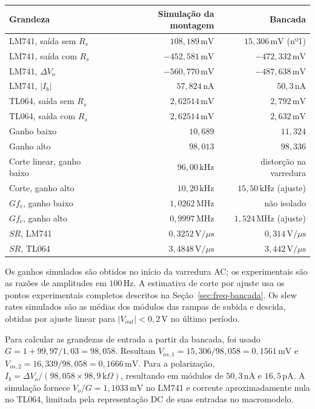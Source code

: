 \documentclass[11pt,a4paper]{article}
\begin{document}
\begin{center}\small
\setlength{\tabcolsep}{4pt}
\begin{tabular}{@{}lrr@{}}
\toprule
\textbf{Grandeza} & \textbf{Simulação da montagem} & \textbf{Bancada} \\
\midrule
LM741, saída sem \(R_s\) & \(108{,}189\,\text{mV}\) & \(15{,}306\,\text{mV}\) (nº1) \\
LM741, saída com \(R_s\) & \(-452{,}581\,\text{mV}\) & \(-472{,}332\,\text{mV}\) \\
LM741, \(\Delta V_o\) & \(-560{,}770\,\text{mV}\) & \(-487{,}638\,\text{mV}\) \\
LM741, \(\lvert I_b\rvert\) & \(57{,}824\,\text{nA}\) & \(50{,}3\,\text{nA}\) \\
TL064, saída sem \(R_s\) & \(2{,}62514\,\text{mV}\) & \(2{,}792\,\text{mV}\) \\
TL064, saída com \(R_s\) & \(2{,}62514\,\text{mV}\) & \(2{,}632\,\text{mV}\) \\
Ganho baixo & \(10{,}689\) & \(11{,}324\) \\
Ganho alto & \(98{,}013\) & \(98{,}336\) \\
Corte linear, ganho baixo & \(96{,}00\,\text{kHz}\) & distorção na varredura \\
Corte, ganho alto & \(10{,}20\,\text{kHz}\) & \(15{,}50\,\text{kHz}\) (ajuste) \\
\(Gf_c\), ganho baixo & \(1{,}0262\,\text{MHz}\) & não isolado \\
\(Gf_c\), ganho alto & \(0{,}9997\,\text{MHz}\) & \(1{,}524\,\text{MHz}\) (ajuste) \\
\(SR\), LM741 & \(0{,}3252\,\text{V}/\mu\text{s}\) & \(0{,}314\,\text{V}/\mu\text{s}\) \\
\(SR\), TL064 & \(3{,}4848\,\text{V}/\mu\text{s}\) & \(3{,}442\,\text{V}/\mu\text{s}\) \\
\bottomrule
\end{tabular}
\end{center}

Os ganhos simulados são obtidos no início da varredura AC; os experimentais são as
razões de amplitudes em \(100\,\text{Hz}\). A estimativa de corte por ajuste usa os
pontos experimentais completos descritos na Seção~\ref{sec:freq-bancada}.
Os slew rates simulados são as médias dos módulos das rampas de subida e descida,
obtidas por ajuste linear para \(\lvert V_{out}\rvert<0{,}2\,\text{V}\) no último período.

Para calcular as grandezas de entrada a partir da bancada, foi usado
\(G=1+99{,}97/1{,}03=98{,}058\). Resultam
\(V_{os,1}=15{,}306/98{,}058=0{,}1561\,\text{mV}\) e
\(V_{os,2}=16{,}339/98{,}058=0{,}1666\,\text{mV}\).
Para a polarização, \(I_b=\Delta V_o/(98{,}058\times98{,}9\,\text{k}\Omega)\),
resultando em módulos de \(50{,}3\,\text{nA}\) e \(16{,}5\,\text{pA}\).
A simulação fornece \(V_o/G=1{,}1033\,\text{mV}\) no LM741 e corrente aproximadamente
nula no TL064, limitada pela representação DC de suas entradas no macromodelo.
\end{document}
